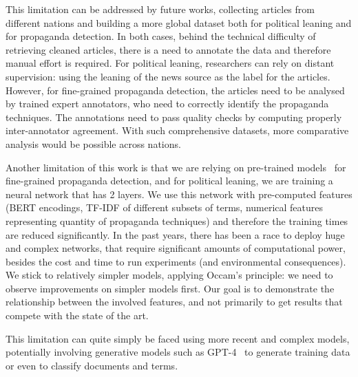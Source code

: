 This limitation can be addressed by future works, collecting articles from different nations and building a more global dataset both for political leaning and for propaganda detection. In both cases, behind the technical difficulty of retrieving cleaned articles, there is a need to annotate the data and therefore manual effort is required. For political leaning, researchers can rely on distant supervision: using the leaning of the news source as the label for the articles. However, for fine-grained propaganda detection, the articles need to be analysed by trained expert annotators, who need to correctly identify the propaganda techniques. The annotations need to pass quality checks by computing properly inter-annotator agreement. With such comprehensive datasets, more comparative analysis would be possible across nations.

Another limitation of this work is that we are
relying on pre-trained models~\citep{da2019fine} for fine-grained propaganda detection, and
for political leaning, we are training a neural network that has 2 layers. We use this network with pre-computed features (BERT encodings, TF-IDF of different subsets of terms, numerical features representing quantity of propaganda techniques) and therefore the training times are reduced significantly.
In the past years, there has been a race to deploy huge and complex networks, that require significant amounts of computational power, besides the cost and time to run experiments (and environmental consequences).
We stick to relatively simpler models, applying Occam's principle: we need to observe improvements on simpler models first.
Our goal is to demonstrate the relationship between the involved features, and not primarily to get results that compete with the state of the art.

This limitation can quite simply be faced using more recent and complex models, potentially involving generative models such as GPT-4~\citep{openai2023gpt4} to generate training data or even to classify documents and terms.

